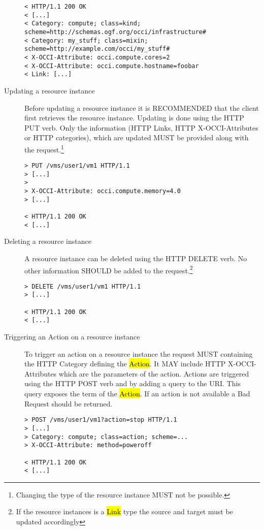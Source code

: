 \documentclass[10pt,a4paper]{article}
\begin{document}
\begin{description}
\begin{verbatim}
< HTTP/1.1 200 OK
< [...]
< Category: compute; class=kind; scheme=http://schemas.ogf.org/occi/infrastructure#
< Category: my_stuff; class=mixin; scheme=http://example.com/occi/my_stuff#
< X-OCCI-Attribute: occi.compute.cores=2
< X-OCCI-Attribute: occi.compute.hostname=foobar
< Link: [...]
\end{verbatim}

\item[Updating a resource instance] Before updating a resource
  instance it is RECOMMENDED that the client first retrieves the
  resource instance. Updating is done using the HTTP PUT verb. Only
  the information (HTTP Links, HTTP X-OCCI-Attributes or HTTP
  categories), which are updated MUST be provided along with the
  request.\footnote{Changing the type of the resource instance MUST
    not be possible.}
\begin{verbatim}
> PUT /vms/user1/vm1 HTTP/1.1
> [...]
> 
> X-OCCI-Attribute: occi.compute.memory=4.0
> [...]
 
< HTTP/1.1 200 OK
< [...]
\end{verbatim}

\item[Deleting a resource instance] A resource instance can be deleted
  using the HTTP DELETE verb. No other information SHOULD be added to
  the request.\footnote{If the resource instances is a \hl{Link} type
    the source and target must be updated accordingly}
\begin{verbatim}
> DELETE /vms/user1/vm1 HTTP/1.1
> [...]

< HTTP/1.1 200 OK
< [...]
\end{verbatim}

\item[Triggering an Action on a resource instance] To trigger an
  action on a resource instance the request MUST containing the HTTP
  Category defining the \hl{Action}. It MAY include HTTP
  X-OCCI-Attributes which are the parameters of the action. Actions
  are triggered using the HTTP POST verb and by adding a query to
  the URI. This query exposes the term of the \hl{Action}. If an
  action is not available a Bad Request should be returned.
\begin{verbatim}
> POST /vms/user1/vm1?action=stop HTTP/1.1
> [...]
> Category: compute; class=action; scheme=...
> X-OCCI-Attribute: method=poweroff

< HTTP/1.1 200 OK
< [...]
\end{verbatim}
\end{description}
\end{document}
